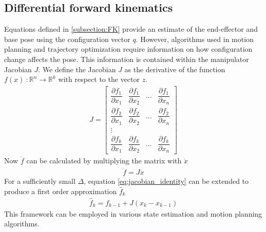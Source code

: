 \documentclass[times, utf8, diplomski, english]{fer}
\begin{document}
\subsection{Differential forward kinematics}
Equations defined in \ref{subsection:FK} provide an estimate of the end-effector and base pose using the configuration vector $q$. 
However, algorithms used in motion planning and trajectory optimization require information on how configuration change affects the pose.
This information is contained within the manipulator Jacobian $J$.
We define the Jacobian $J$ as the derivative of the function $f\left(x\right) \ : \mathbb{R}^n \rightarrow \mathbb{R}^k $ with respect to the vector $z$.
\begin{align}\label{eq:jacobian}
J =
\begin{bmatrix}
    \dfrac{\partial {f_1}}{\partial x_{1}}      & \dfrac{\partial {f}_{1}}{\partial x_{2}}  & \dots & \dfrac{\partial {f}_{1}}{\partial x_{n}}  \\
    \dfrac{\partial{f_2}}{\partial x_{1}}      & \dfrac{\partial {f}_{2}}{\partial x_{2}}  & \dots & \dfrac{\partial {f}_{2}}{\partial x_{n}} \\
    \vdots \\
    \dfrac{\partial {f_k}}{\partial x_{1}}      & \dfrac{\partial {f}_{k}}{\partial x_{2}}  & \dots & \dfrac{\partial {f}_{k}}{\partial x_{n}}
\end{bmatrix}
\end{align}
Now $\dot{f}$ can be calculated by multiplying the matrix with $\dot{x}$
\begin{align} \label{eq:jacobian_identity}
\dot{f} = J \dot{x}
\end{align}
For a sufficiently small $\Delta$, equation \ref{eq:jacobian_identity} can be extended to produce a first order approximation $\hat{f}_k$ 
\begin{align} \label{eq:jacobian_estimate}
\hat{f}_k = f_{k-1} + J\left(x_{k} - x_{k-1}\right)
\end{align}
This framework can be employed in various state estimation and motion planning algorithms.
\end{document}
